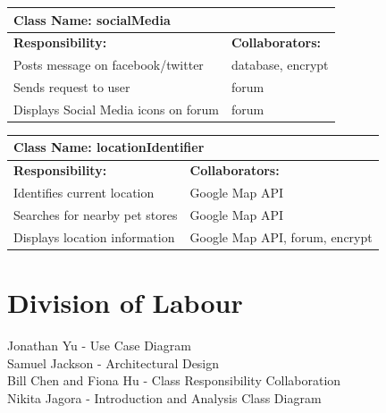 \documentclass[]{article}
\begin{document}
\begin{table}[H]
	\centering
	\begin{tabular}{|p{7cm}|p{7cm}|}
		\hline 
		\multicolumn{2}{|l|}{\textbf{Class Name:} socialMedia} \\
		\hline
		\textbf{Responsibility:} & \textbf{Collaborators:} \\
		\hline
		Posts message on facebook/twitter & database, encrypt \\
		\hline
		Sends request to user & forum \\
		\hline
		Displays Social Media icons on forum & forum \\
		\hline
	\end{tabular}
\end{table}
\begin{table}[H]
	\centering
	\begin{tabular}{|p{7cm}|p{7cm}|}
		\hline 
		\multicolumn{2}{|l|}{\textbf{Class Name:} locationIdentifier} \\
		\hline
		\textbf{Responsibility:} & \textbf{Collaborators:} \\
		\hline
		Identifies current location & Google Map API \\
		\hline
		Searches for nearby pet stores & Google Map API \\
		\hline
		Displays location information & Google Map API, forum, encrypt \\
		\hline
	\end{tabular}
\end{table}

\appendix
\section{Division of Labour}
\label{sec:division_of_labour}

Jonathan Yu - Use Case Diagram \\
Samuel Jackson - Architectural Design \\Bill Chen and Fiona Hu - Class Responsibility Collaboration \\Nikita Jagora - Introduction and Analysis Class Diagram\\
\end{document}
